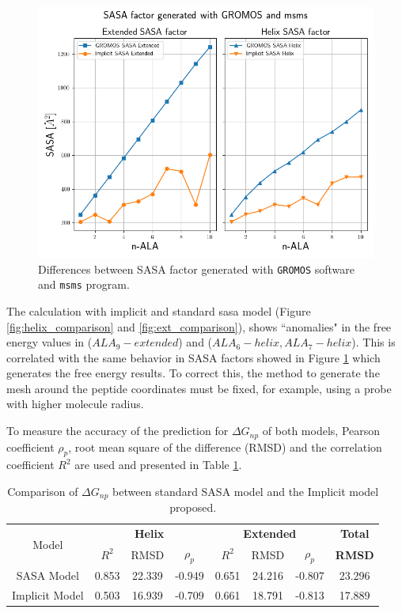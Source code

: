 \begin{figure}[h]
    \centering
    \includegraphics[scale=0.6]{Figures/Chapter_6/SASA_factor.png}
    \caption{Differences between SASA factor generated with \texttt{GROMOS} software and \texttt{msms} program.}
    \label{fig:SASA_comparison}
\end{figure}

The calculation with implicit and standard sasa model (Figure \ref{fig:helix_comparison} and \ref{fig:ext_comparison}), shows ``anomalies" in the free energy values in ($ALA_{9}-extended$) and 
($ALA_{6}-helix, ALA_{7}-helix$). This is correlated with the same behavior in SASA factors showed in Figure \ref{fig:SASA_comparison} which generates the free energy results. To correct this, the method to generate the mesh around the peptide coordinates must be fixed, for example, using a probe with higher molecule radius. 

To measure the accuracy of the prediction for $\Delta G_{np}$ of both models, Pearson coefficient $\rho_p$, root mean square of the difference (RMSD) and the correlation coefficient $R^2$ are used and presented in Table \ref{table:measures_1}. 

\begin{table}[th] %
    \centering
    \begin{tabular}{c|ccc|ccc|c}
    \toprule
    \multirow{2}{4em}{Model}           &   \multicolumn{3}{c|}{\textbf{Helix}} & \multicolumn{3}{c}{\textbf{Extended}}&\textbf{Total}\\

    &   $R^2$ & RMSD   &   $\rho_p $ &  $R^2$ & RMSD   &   $\rho_p $ & \textbf{RMSD}\\
    \midrule
    SASA Model & 0.853 & 22.339 & -0.949 & 0.651 & 24.216 & -0.807 & 23.296\\
    Implicit Model & 0.503 & 16.939 & -0.709 & 0.661 & 18.791 & -0.813 & 17.889\\      
    \bottomrule
    \end{tabular}
    \caption{Comparison of $\Delta G_{np}$ between standard SASA model and the Implicit model proposed.}
    \label{table:measures_1}
\end{table}     

